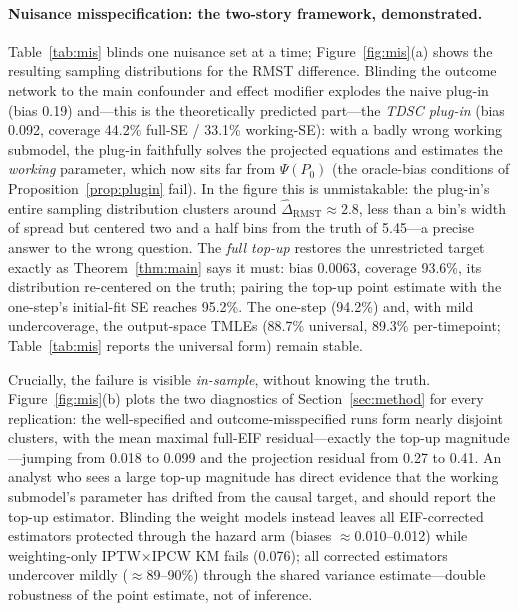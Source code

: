 \documentclass[11pt]{article}
\theoremstyle{remark}
\begin{document}
\paragraph{Nuisance misspecification: the two-story framework, demonstrated.} Table~\ref{tab:mis} blinds one nuisance set at a time; Figure~\ref{fig:mis}(a) shows the resulting sampling distributions for the RMST difference. Blinding the outcome network to the main confounder and effect modifier explodes the naive plug-in (bias 0.19) and---this is the theoretically predicted part---the \emph{TDSC plug-in} (bias 0.092, coverage 44.2\% full-SE / 33.1\% working-SE): with a badly wrong working submodel, the plug-in faithfully solves the projected equations and estimates the \emph{working} parameter, which now sits far from $\Psi(P_0)$ (the oracle-bias conditions of Proposition~\ref{prop:plugin} fail). In the figure this is unmistakable: the plug-in's entire sampling distribution clusters around $\widehat\Delta_{\mathrm{RMST}} \approx 2.8$, less than a bin's width of spread but centered two and a half bins from the truth of 5.45---a precise answer to the wrong question. The \emph{full top-up} restores the unrestricted target exactly as Theorem~\ref{thm:main} says it must: bias 0.0063, coverage 93.6\%, its distribution re-centered on the truth; pairing the top-up point estimate with the one-step's initial-fit SE reaches 95.2\%. The one-step (94.2\%) and, with mild undercoverage, the output-space TMLEs (88.7\% universal, 89.3\% per-timepoint; Table~\ref{tab:mis} reports the universal form) remain stable.

Crucially, the failure is visible \emph{in-sample}, without knowing the truth. Figure~\ref{fig:mis}(b) plots the two diagnostics of Section~\ref{sec:method} for every replication: the well-specified and outcome-misspecified runs form nearly disjoint clusters, with the mean maximal full-EIF residual---exactly the top-up magnitude---jumping from 0.018 to 0.099 and the projection residual from 0.27 to 0.41. An analyst who sees a large top-up magnitude has direct evidence that the working submodel's parameter has drifted from the causal target, and should report the top-up estimator. Blinding the weight models instead leaves all EIF-corrected estimators protected through the hazard arm (biases $\approx$0.010--0.012) while weighting-only IPTW$\times$IPCW KM fails (0.076); all corrected estimators undercover mildly ($\approx$89--90\%) through the shared variance estimate---double robustness of the point estimate, not of inference.
\end{document}
